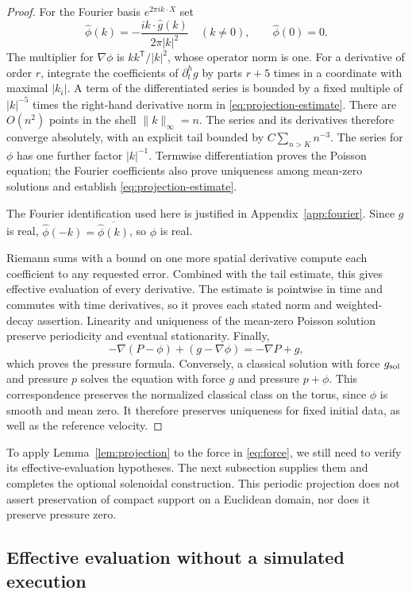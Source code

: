 \begin{proof}
For the Fourier basis $e^{2\pi i k\cdot X}$ set
\[
 \widehat\phi(k)=-\frac{i k\cdot\widehat g(k)}{2\pi|k|^2}
 \quad(k\ne0),\qquad \widehat\phi(0)=0.
\]
The multiplier for $\nabla\phi$ is $kk^{\mathsf T}/|k|^2$,
whose operator norm is one. For a derivative of order $r$, integrate
the coefficients of $\partial_t^hg$ by parts $r+5$ times in a
coordinate with maximal $|k_i|$. A term of the differentiated series
is bounded by a fixed multiple of $|k|^{-5}$ times the right-hand
derivative norm in \eqref{eq:projection-estimate}. There are
$O(n^2)$ points in the shell $\|k\|_\infty=n$. The series and its
derivatives therefore converge absolutely, with an explicit tail
bounded by $C\sum_{n>K}n^{-3}$. The series for $\phi$ has one
further factor $|k|^{-1}$. Termwise differentiation proves the
Poisson equation; the Fourier coefficients also prove uniqueness
among mean-zero solutions and establish
\eqref{eq:projection-estimate}.

The Fourier identification used here is justified in
Appendix~\ref{app:fourier}. Since $g$ is real,
$\widehat\phi(-k)=\overline{\widehat\phi(k)}$, so $\phi$ is real.

Riemann sums with a bound on one more spatial derivative compute
each coefficient to any requested error. Combined with the tail
estimate, this gives effective evaluation of every derivative.
The estimate is pointwise in time and commutes with time
derivatives, so it proves each stated norm and weighted-decay
assertion. Linearity and uniqueness of the mean-zero Poisson
solution preserve periodicity and eventual stationarity. Finally,
\[
 -\nabla(P-\phi)+(g-\nabla\phi)=-\nabla P+g,
\]
which proves the pressure formula.
Conversely, a classical solution with force $g_{\rm sol}$ and pressure
$p$ solves the equation with force $g$ and pressure $p+\phi$.
This correspondence preserves the normalized classical class on the
torus, since $\phi$ is smooth and mean zero. It therefore preserves
uniqueness for fixed initial data, as well as the reference velocity.
\end{proof}

To apply Lemma~\ref{lem:projection} to the force in \eqref{eq:force},
we still need to verify its effective-evaluation hypotheses. The next
subsection supplies them and completes the optional solenoidal
construction. This periodic projection does not assert preservation
of compact support on a Euclidean domain, nor does it preserve
pressure zero.

\subsection{Effective evaluation without a simulated execution}
